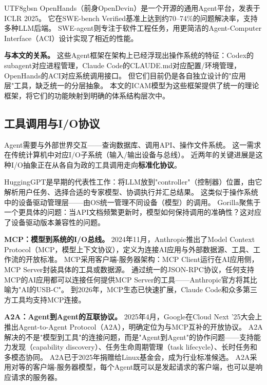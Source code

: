 \documentclass[11pt,a4paper]{article}
\begin{document}
\begin{CJK*}{UTF8}{gbsn}
OpenHands\cite{openhands_paper_2025}（前身OpenDevin）是一个开源的通用Agent平台，发表于ICLR 2025。
它在SWE-bench Verified基准上达到约70--74\%的问题解决率\cite{swebench2023}，支持多种LLM后端。
SWE-agent\cite{sweagent2024}则专注于软件工程任务，用更简洁的Agent-Computer Interface（ACI）设计实现了相近的性能。

\textbf{与本文的关系。}
这些Agent框架在架构上已经浮现出操作系统的特征：Codex的subagent对应进程管理，Claude Code的CLAUDE.md对应配置/环境管理，OpenHands的ACI对应系统调用接口。
但它们目前仍是各自独立设计的"应用层"工具，缺乏统一的分层抽象。
本文的ICAM模型为这些框架提供了统一的理论框架，将它们的功能映射到明确的体系结构层次中。

\subsection{工具调用与I/O协议}
\label{sec:related-io}

Agent需要与外部世界交互——查询数据库、调用API、操作文件系统。
这一需求在传统计算机中对应I/O子系统（输入/输出设备与总线）。
近两年的关键进展是这种I/O抽象正在从各自为政的工具调用走向\textbf{标准化协议}。

HuggingGPT\cite{hugginggpt2023}是早期的代表性工作：将LLM放到"controller"（控制器）位置，由它解析用户任务、选择合适的专家模型、协调执行并汇总结果。
这类似于操作系统中的设备驱动管理层——由OS统一管理不同设备（模型）的调用。
Gorilla\cite{patil2024gorilla}聚焦于一个更具体的问题：当API文档频繁更新时，模型如何保持调用的准确性？这对应了设备驱动版本兼容性的问题。

\textbf{MCP：模型到系统的I/O总线。}
2024年11月，Anthropic推出了Model Context Protocol（MCP，模型上下文协议）\cite{mcp_intro_2026}，定义为连接AI应用与外部数据源、工具、工作流的开放标准。
MCP采用客户端-服务器架构：MCP Client运行在AI应用侧，MCP Server封装具体的工具或数据源。
通过统一的JSON-RPC协议，任何支持MCP的AI应用都可以连接任何提供MCP Server的工具——Anthropic官方将其比喻为"AI的USB-C"。
到2026年，MCP生态已快速扩展，Claude Code\cite{anthropic_claudecode_mcp_2026}和众多第三方工具均支持MCP连接。

\textbf{A2A：Agent到Agent的互联协议。}
2025年4月，Google在Cloud Next '25大会上推出Agent-to-Agent Protocol（A2A）\cite{google_a2a_2025}，明确定位为与MCP互补的开放协议。
A2A解决的不是"模型到工具"的连接问题，而是"Agent到Agent"的协作问题——支持能力发现（capability discovery）、任务生命周期管理（task lifecycle）、长时任务和多模态协同。
A2A已于2025年捐赠给Linux基金会，成为行业标准候选。
A2A采用对等的客户端-服务器模型，每个Agent既可以是发起请求的客户端，也可以是响应请求的服务器。


\end{CJK*}
\end{document}
